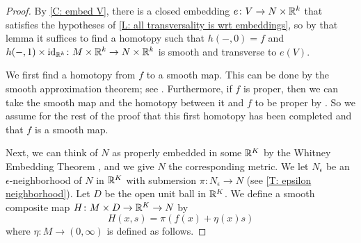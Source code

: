 \begin{proof}
	By \cref{C: embed V}, there is a closed embedding $e \colon V \to N \times \mathbb{R}^k$ that satisfies the hypotheses of \cref{L: all transversality is wrt embeddings}, so by that lemma it suffices to find a homotopy such that $h(-,0) = f$ and $h(-,1) \times \mathrm{id}_{\mathbb{R}^k} \colon M \times \mathbb{R}^k \to N \times \mathbb{R}^k$ is smooth and transverse to $e(V)$.

	We first find a homotopy from $f$ to a smooth map.
	This can be done by the smooth approximation theorem; see \cite[Corollary 9.2.31]{MaDo92}.
	Furthermore, if $f$ is proper, then we can take the smooth map and the homotopy between it and $f$ to be proper by \cite[Corollary 9.2.36]{MaDo92}.
	So we assume for the rest of the proof that this first homotopy has been completed and that $f$ is a smooth map.

	Next, we can think of $N$ as properly embedded in some $\mathbb{R}^K$ by the Whitney Embedding Theorem \cite[Section 1.8]{GuPo74}, and we give $N$ the corresponding metric.
	We let $N_\epsilon$ be an $\epsilon$-neighborhood of $N$ in $\mathbb{R}^K$ with submersion $\pi \colon N_\epsilon \to N$ (see \cref{T: epsilon neighborhood}).
	Let $D$ be the open unit ball in $\mathbb{R}^K$.
	We define a smooth composite map $H \colon M \times D \to \mathbb{R}^K \to N$ by
	$$H(x,s) = \pi(f(x)+ \eta(x)s)$$
	where $\eta \colon M \to (0,\infty)$ is defined as follows.


\end{proof}
